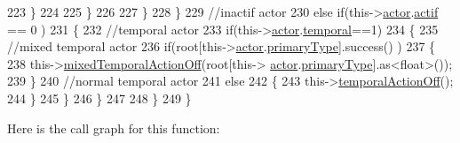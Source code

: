 \begin{DoxyCode}
223                     \}
224                                         
225                 \}
226 
227             \}
228         \}
229         \textcolor{comment}{//inactif actor}
230         \textcolor{keywordflow}{else} \textcolor{keywordflow}{if}(this->\hyperlink{class_cool_board_actor_a8f190db9f7a39fddbcef7f152da970e9}{actor}.\hyperlink{struct_cool_board_actor_1_1state_a7963178c2de01ef0d2861f9f59ad6f3c}{actif} == 0 )
231         \{
232             \textcolor{comment}{//temporal actor}
233             \textcolor{keywordflow}{if}(this->\hyperlink{class_cool_board_actor_a8f190db9f7a39fddbcef7f152da970e9}{actor}.\hyperlink{struct_cool_board_actor_1_1state_a6442a8c3a30abc48472f3e5284b786ea}{temporal}==1)
234             \{
235                 \textcolor{comment}{//mixed temporal actor}
236                 \textcolor{keywordflow}{if}(root[this->\hyperlink{class_cool_board_actor_a8f190db9f7a39fddbcef7f152da970e9}{actor}.\hyperlink{struct_cool_board_actor_1_1state_a8a0b318fd2814cf67fe74ee8164df55e}{primaryType}].success() )
237                 \{
238                     this->\hyperlink{class_cool_board_actor_a00b29c4abf0388551aa6812372113cf1}{mixedTemporalActionOff}(root[this->
      \hyperlink{class_cool_board_actor_a8f190db9f7a39fddbcef7f152da970e9}{actor}.\hyperlink{struct_cool_board_actor_1_1state_a8a0b318fd2814cf67fe74ee8164df55e}{primaryType}].as<\textcolor{keywordtype}{float}>());
239                 \}
240                 \textcolor{comment}{//normal temporal actor}
241                 \textcolor{keywordflow}{else}
242                 \{
243                     this->\hyperlink{class_cool_board_actor_a02698bd647df49cabbe74513d4d88918}{temporalActionOff}();
244                 \}
245             \}           
246         \}
247 
248     \} 
249 \}
\end{DoxyCode}
Here is the call graph for this function\+:\nopagebreak
